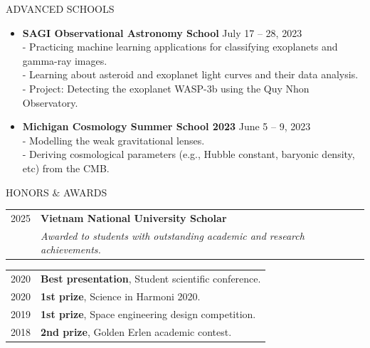 \documentclass{resume} %
\begin{document}
\begin{rSection}{ADVANCED SCHOOLS} 
\begin{itemize}
    \item \textbf{SAGI Observational Astronomy School} \hfill July 17 – 28, 2023\\
    - Practicing machine learning applications for classifying exoplanets and gamma-ray images.\\
    - Learning about asteroid and exoplanet light curves and their data analysis.\\
    - Project: Detecting the exoplanet WASP-3b using the Quy Nhon Observatory.

    \item \textbf{Michigan Cosmology Summer School 2023} \hfill June 5 – 9, 2023\\
    - Modelling the weak gravitational lenses.\\
    - Deriving cosmological parameters (e.g., Hubble constant, baryonic density, etc) from the CMB.
\end{itemize}
\end{rSection}
\begin{rSection}{HONORS $\&$ AWARDS} 
\begin{tabular}{ll}
    2025 & \textbf{Vietnam National University Scholar} \\
    & \textit{Awarded to students with outstanding academic and research achievements.}
\end{tabular}

\begin{tabular}{ll}
    2020 & \textbf{Best presentation}, Student scientific conference. \\
    2020 & \textbf{1st prize}, Science in Harmoni 2020. \\
    2019 & \textbf{1st prize}, Space engineering design competition. \\
    2018 & \textbf{2nd prize}, Golden Erlen academic contest. \\ 
\end{tabular}


\end{rSection}

\end{document}
